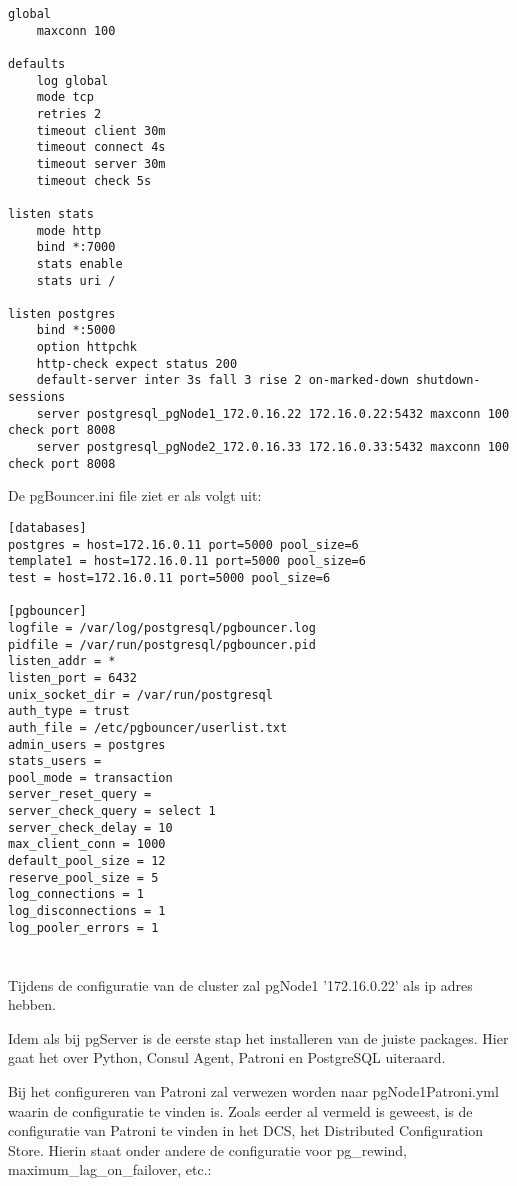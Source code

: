 \begin{lstlisting}
global
    maxconn 100

defaults
    log global
    mode tcp
    retries 2
    timeout client 30m
    timeout connect 4s
    timeout server 30m
    timeout check 5s

listen stats
    mode http
    bind *:7000
    stats enable
    stats uri /

listen postgres
    bind *:5000
    option httpchk
    http-check expect status 200
    default-server inter 3s fall 3 rise 2 on-marked-down shutdown-sessions
    server postgresql_pgNode1_172.0.16.22 172.16.0.22:5432 maxconn 100 check port 8008
    server postgresql_pgNode2_172.0.16.33 172.16.0.33:5432 maxconn 100 check port 8008
\end{lstlisting}

De pgBouncer.ini file ziet er als volgt uit:

\begin{lstlisting}
[databases]
postgres = host=172.16.0.11 port=5000 pool_size=6
template1 = host=172.16.0.11 port=5000 pool_size=6
test = host=172.16.0.11 port=5000 pool_size=6

[pgbouncer]
logfile = /var/log/postgresql/pgbouncer.log
pidfile = /var/run/postgresql/pgbouncer.pid
listen_addr = *
listen_port = 6432
unix_socket_dir = /var/run/postgresql
auth_type = trust
auth_file = /etc/pgbouncer/userlist.txt
admin_users = postgres
stats_users =
pool_mode = transaction
server_reset_query =
server_check_query = select 1
server_check_delay = 10
max_client_conn = 1000
default_pool_size = 12
reserve_pool_size = 5
log_connections = 1
log_disconnections = 1
log_pooler_errors = 1  
\end{lstlisting}


\section{}
\label{sec:pgNode1}
Tijdens de configuratie van de cluster zal pgNode1 '172.16.0.22' als ip adres hebben.


Idem als bij pgServer is de eerste stap het installeren van de juiste packages. Hier gaat het over Python, Consul Agent, Patroni en PostgreSQL uiteraard.

Bij het configureren van Patroni zal verwezen worden naar pgNode1Patroni.yml waarin de configuratie te vinden is. Zoals eerder al vermeld is geweest, is de configuratie van Patroni te vinden in het DCS, het Distributed Configuration Store. Hierin staat onder andere de configuratie voor pg\_rewind, maximum\_lag\_on\_failover, etc.:

